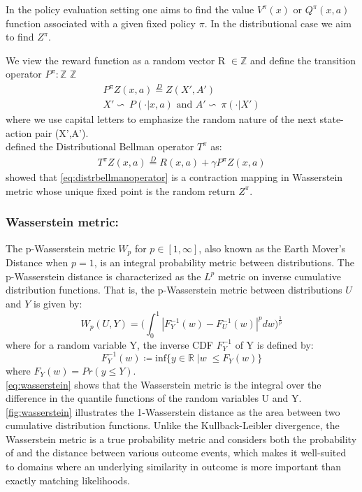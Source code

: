 In the policy evaluation setting \citep{Sutton1998} one aims to find the value $V^\pi(x)$ or $Q^\pi(x,a)$ 
function associated with a given fixed policy $\pi$. In the distributional case we aim to find $Z^\pi$.

We view the reward function as a random vector R $\in \mathbb{Z}$ and define the transition
operator 
$P^\pi: \mathbb{Z} $ \ra $\mathbb{Z}$
\begin{eqnarray}
    P^\pi Z(x,a) \stackrel{D}{=} Z(X',A')\\
    X'\backsim\ P(\cdot|x,a) \text{ and } A' \backsim\ \pi(\cdot |X')
\end{eqnarray}
where we use capital letters to emphasize the random nature of the next state-action pair
 (X',A').\\
\cite{Bellemare2017} defined the Distributional Bellman operator $T^\pi$ as:
\begin{eqnarray}
    T^\pi Z(x,a) \stackrel{D}{=} R(x,a) + \gamma P^\pi Z(x,a) \label{eq:distrbellmanoperator}
\end{eqnarray}
\cite{Bellemare2017} showed that \eqref{eq:distrbellmanoperator} is a contraction
mapping in Wasserstein metric whose unique fixed point is the 
random return $Z^\pi$.

\subsubsection{Wasserstein metric:}
The p-Wasserstein metric $W_p$ for $p \in [1,\infty]$, also known as the Earth Mover's 
Distance when $p=1$, is an integral probability metric between distributions. The
p-Wasserstein distance is characterized 
as the $L^p $ metric on inverse cumulative distribution functions. That is, the
p-Wasserstein metric between distributions $U $ and $Y $ is given by:
\begin{equation}
    W_p(U,Y) = \big (  \int_{0}^{1} | F_Y^{-1}(w) - F_U^{-1}(w) |^p dw   \big )^{\frac{1}{p}} \label{eq:wasserstein}
\end{equation}
where for a random variable Y, the inverse CDF $F_Y^{-1}$ of Y is defined by:
\begin{equation}
    F_Y^{-1}(w) \coloneqq \text{inf} \big\{ y \in \mathbb{R} \; | w \; \leq   F_Y(w)    \big\}
\end{equation}
where $F_Y(w) = Pr(y \leq Y)$. \\
\ref{eq:wasserstein} shows that the Wasserstein metric is the integral over the difference in the quantile functions 
of the random variables U and Y.
\ref{fig:wasserstein} illustrates the 1-Wasserstein distance as the area between two cumulative distribution
functions.
Unlike the Kullback-Leibler divergence, the Wasserstein metric is a true probability
metric and considers both the probability of
and the distance between various outcome events, which makes it well-suited to domains 
where an underlying similarity in outcome is more important than exactly matching likelihoods.

